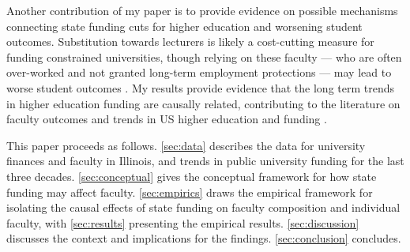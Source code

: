 Another contribution of my paper is to provide evidence on possible mechanisms connecting state funding cuts for higher education and worsening student outcomes.
Substitution towards lecturers is likely a cost-cutting measure for funding constrained universities, though relying on these faculty --- who are often over-worked and not granted long-term employment protections --- may lead to worse student outcomes \citep{ehrenberg2005tenured,zhu2021limited,jaeger2011examining}.
My results provide evidence that the long term trends in higher education funding are causally related, contributing to the literature on faculty outcomes \citep{ehrenberg2003studying} and trends in US higher education and funding \citep{hoxby2009changing,ehrenberg2012american}.

This paper proceeds as follows.
\autoref{sec:data} describes the data for university finances and faculty in Illinois, and trends in public university funding for the last three decades.
\autoref{sec:conceptual} gives the conceptual framework for how state funding may affect faculty.
\autoref{sec:empirics} draws the empirical framework for isolating the causal effects of state funding on faculty composition and individual faculty, with \autoref{sec:results} presenting the empirical results.
\autoref{sec:discussion} discusses the context and implications for the findings.
\autoref{sec:conclusion} concludes.
